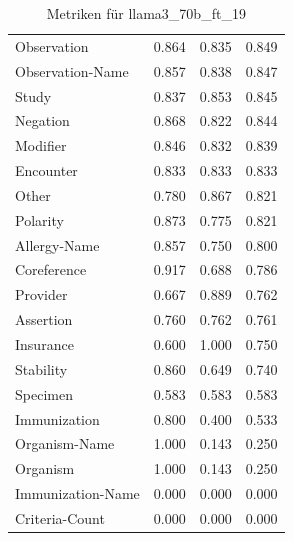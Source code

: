 \begin{table}[htbp]
\begin{tabular}{p{5cm}ccc}
Observation & 0.864 & 0.835 & 0.849 \\
Observation-Name & 0.857 & 0.838 & 0.847 \\
Study & 0.837 & 0.853 & 0.845 \\
Negation & 0.868 & 0.822 & 0.844 \\
Modifier & 0.846 & 0.832 & 0.839 \\
Encounter & 0.833 & 0.833 & 0.833 \\
Other & 0.780 & 0.867 & 0.821 \\
Polarity & 0.873 & 0.775 & 0.821 \\
Allergy-Name & 0.857 & 0.750 & 0.800 \\
Coreference & 0.917 & 0.688 & 0.786 \\
Provider & 0.667 & 0.889 & 0.762 \\
Assertion & 0.760 & 0.762 & 0.761 \\
Insurance & 0.600 & 1.000 & 0.750 \\
Stability & 0.860 & 0.649 & 0.740 \\
Specimen & 0.583 & 0.583 & 0.583 \\
Immunization & 0.800 & 0.400 & 0.533 \\
Organism-Name & 1.000 & 0.143 & 0.250 \\
Organism & 1.000 & 0.143 & 0.250 \\
Immunization-Name & 0.000 & 0.000 & 0.000 \\
Criteria-Count & 0.000 & 0.000 & 0.000 \\
\bottomrule
\end{tabular}
\caption{Metriken für llama3_70b_ft_19}
\label{tab:metrics_llama3_70b_ft_19}
\end{table}